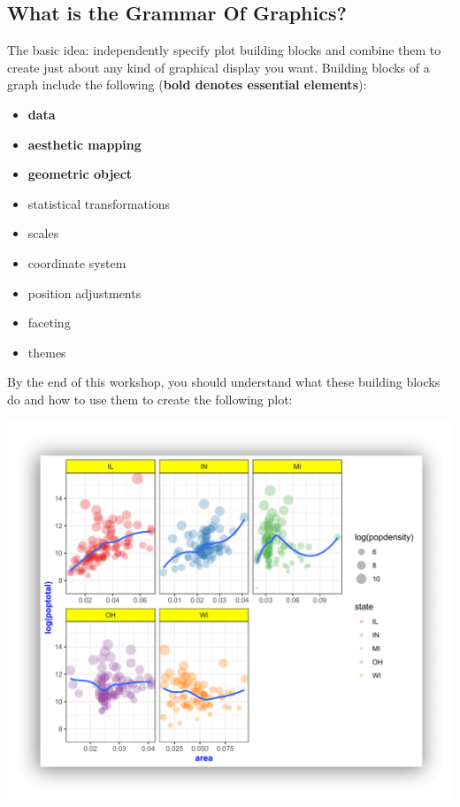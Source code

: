 \documentclass[]{book}
\providecommand{\tightlist}{%
  \setlength{\itemsep}{0pt}\setlength{\parskip}{0pt}}
\begin{document}
\hypertarget{what-is-the-grammar-of-graphics}{%
\subsection{What is the Grammar Of Graphics?}\label{what-is-the-grammar-of-graphics}}

The basic idea: independently specify plot building blocks and combine them to create just
about any kind of graphical display you want. Building blocks of a graph include the
following (\textbf{bold denotes essential elements}):

\begin{itemize}
\tightlist
\item
  \textbf{data}
\item
  \textbf{aesthetic mapping}
\item
  \textbf{geometric object}
\item
  statistical transformations
\item
  scales
\item
  coordinate system
\item
  position adjustments
\item
  faceting
\item
  themes
\end{itemize}

By the end of this workshop, you should understand what these building blocks do and
how to use them to create the following plot:

\includegraphics{R/Rgraphics/images/final_plot.png}
\end{document}
